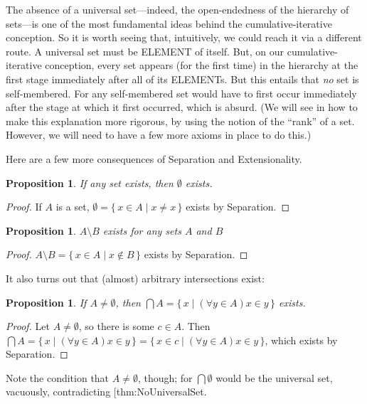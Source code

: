 \documentclass[10pt,a4paper]{article}
\makeatletter
\newcommand*{\olup}[1]{\MakeUppercase{#1}}
\theoremstyle{plain}
\newtheorem{prop}[thm]{Proposition}
\theoremstyle{definition}
\theoremstyle{remark}
\newcommand*{\ollabel}[1]{\label{#1}}
\newcommand{\olref}{\@ifnextchar[{\olref@i}{\olref@final}}
\def\olref@i[#1]{\@ifnextchar[{\olref@ii}{\olref@final}}
\def\olref@ii[#1]{\@ifnextchar[{\olref@iii}{\olref@final}}
\def\olref@iii[#1]{\olref@final}
\def\olref@final#1{\ref{#1}}
\providecommand{\Setabs}[2]{\{\, #1 \mid #2 \,\}}
\makeatother
\begin{document}
The absence of a universal set---indeed, the open-endedness of the
hierarchy of sets---is one of the most fundamental ideas behind the
cumulative-iterative conception. So it is worth seeing that,
intuitively, we could reach it via a different route. A universal set
must be \olup{element} of itself. But, on our cumulative-iterative
conception, every set appears (for the first time) in the hierarchy at
the first stage immediately after all of its \olup{element}s. But this
entails that \emph{no} set is self-membered. For any self-membered set
would have to first occur immediately after the stage at which it
first occurred, which is absurd. (We will see in
\olref[sth][spine][rank]{defnsetrank} how to make this explanation
more rigorous, by using the notion of the ``rank'' of a set. However,
we will need to have a few more axioms in place to do this.)

Here are a few more consequences of Separation and Extensionality.

\begin{prop}\ollabel{prop:emptyexists}
If any set exists, then $\emptyset$ exists.
\end{prop}

\begin{proof}
If $A$ is a set, $\emptyset = \Setabs{x \in A}{x \neq x}$ exists by Separation.
\end{proof}

\begin{prop}
$A \setminus B$ exists for any sets $A$ and $B$
\end{prop}

\begin{proof}
$A \setminus B = \Setabs{x \in A}{x \notin B}$ exists by Separation.
\end{proof}

It also turns out that (almost) arbitrary intersections exist:

\begin{prop}\ollabel{prop:intersectionsexist}
If $A \neq \emptyset$, then $\bigcap A = \Setabs{x}{(\forall y \in A)x \in y}$ exists.
\end{prop}

\begin{proof}
Let $A \neq \emptyset$, so there is some $c \in A$. Then $\bigcap A =
\Setabs{x}{(\forall y \in A)x \in y} = \Setabs{x \in c}{(\forall y \in
A)x \in y}$, which exists by Separation.
\end{proof}

Note the condition that $A \neq \emptyset$, though; for $\bigcap
\emptyset$ would be the universal set, vacuously, contradicting
\olref{thm:NoUniversalSet}.
\end{document}
